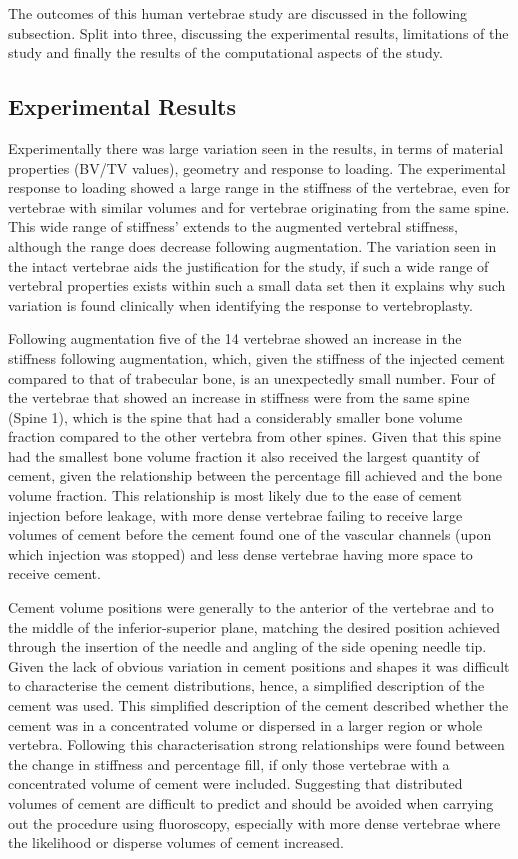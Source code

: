 The outcomes of this human vertebrae study are discussed in the following
subsection. Split into three, discussing the experimental results, limitations
of the study and finally the results of the computational aspects of the study.

\subsection{Experimental Results} \label{sec:exp_disc}

Experimentally there was large variation seen in the results, in terms of
material properties (BV/TV values), geometry and response to loading.  The
experimental response to loading showed a large range in the stiffness of the
vertebrae, even for vertebrae with similar volumes and for vertebrae
originating from the same spine.  This wide range of stiffness' extends to the
augmented vertebral stiffness, although the range does decrease following
augmentation.  The variation seen in the intact vertebrae aids the
justification for the study, if such a wide range of vertebral properties
exists within such a small data set then it explains why such variation is
found clinically when identifying the response to vertebroplasty.

Following augmentation five of the 14 vertebrae showed an increase in the
stiffness following augmentation, which, given the stiffness of the injected
cement compared to that of trabecular bone, is an unexpectedly small number.
Four of the vertebrae that showed an increase in stiffness were from the same
spine (Spine 1), which is the spine that had a considerably smaller bone volume
fraction compared to the other vertebra from other spines.  Given that this
spine had the smallest bone volume fraction it also received the largest
quantity of cement, given the relationship between the percentage fill achieved
and the bone volume fraction.  This relationship is most likely due to the ease
of cement injection before leakage, with more dense vertebrae failing to
receive large volumes of cement before the cement found one of the vascular
channels (upon which injection was stopped) and less dense vertebrae having
more space to receive cement.

Cement volume positions were generally to the anterior of the vertebrae and to
the middle of the inferior-superior plane, matching the desired position
achieved through the insertion of the needle and angling of the side opening
needle tip.  Given the lack of obvious variation in cement positions and shapes
it was difficult to characterise the cement distributions, hence, a simplified
description of the cement was used.  This simplified description of the cement
described whether the cement was in a concentrated volume or dispersed in a
larger region or whole vertebra.  Following this characterisation strong
relationships were found between the change in stiffness and percentage fill,
if only those vertebrae with a concentrated volume of cement were included.
Suggesting that distributed volumes of cement are difficult to predict and
should be avoided when carrying out the procedure using fluoroscopy, especially
with more dense vertebrae where the likelihood or disperse volumes of cement
increased.


